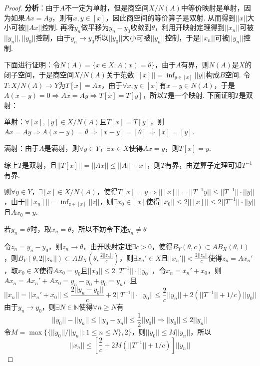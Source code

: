 \documentclass[12pt, a4paper, oneside]{ctexart}
\let\leq=\leqslant %
\let\geq=\geqslant %
\def\N{\mathbb{N}}          %
\def\add{\vspace{1ex}}      %
\begin{document}
\begin{proof}
    \textbf{分析}：由于$A$不一定为单射，但是商空间$X/N(A)$中等价映射是单射，因为如果$Ax=Ay$，则有$x,y\in [x]$，因此商空间的等价算子是双射. 从而得到$||x||$大小可被$||Ax||$控制. 再将$y_n$做平移为$y_n-y_0$收敛到$\theta$，利用开映射定理得到$||x_n||$可被$||y_n||,||y_0||$控制，由于$y_n\to y_0$所以$||y_0||$大小可被$||y_n||$控制，于是$||x_n||$可被$||y_n||$控制.
    
    下面进行证明：令$N(A) = \{x\in X:A(x) = \theta\}$，由于$A$有界，则$N(A)$是$X$的闭子空间，于是商空间$X/N(A)$关于范数$||[x]|| = \inf_{y\in[x]}||y||$构成$B$空间. 令$T:X/N(A)\to Y$为$T[x] = Ax$，由于$\forall x,y\in [x]$有$x-y \in N(A)$，于是$A(x-y) = 0\Rightarrow Ax=Ay\Rightarrow T[x] = T[y]$，所以$T$是一个映射. 下面证明$T$是双射：

    \noindent 单射：$\forall [x],[y]\in X/N(A)$且$T[x] = T[y]$，则$Ax=Ay\Rightarrow A(x-y) = \theta\Rightarrow[x-y] = [\theta]\Rightarrow[x]=[y]$.

    \noindent 满射：由于$A$是满射，则$\forall y\in Y$，$\exists x\in X$使得$Ax=y$，则$T[x] = y$.

    综上$T$是双射，且$||T[x]|| = ||Ax||\leq ||A||\cdot||x||$，则$T$有界，由逆算子定理可知$T^{-1}$有界.

    则$\forall y\in Y$，$\exists [x]\in X/N(A)$，使得$T[x] = y\Rightarrow ||[x]|| = ||T^{-1}y||\leq ||T^{-1}||\cdot ||y||$，由于$||[x_n]|| = \inf_{z\in[x]}||z||$，则$\exists x_0\in [x]$使得$||x_0||\leq 2||[x]||\leq 2||T^{-1}||\cdot ||y||$且$Ax_0 = y$.

    若$y_n=\theta$时，取$x_n = \theta$，所以不妨令下述$y_n\neq \theta$

    令$z_n = y_n-y_0$，则$z_n\to \theta$，由开映射定理$\exists c>0$，\add 使得$B_Y(\theta, c)\subset AB_X(\theta, 1)$，则$B_Y(\theta,2||z_n||)\subset AB_X(\theta,\frac{2||z_n||}{c})$，则$\exists x_n'\in X$且$||x_n'|| < \frac{2||z_n||}{c}$使得$z_n=Ax_n'$，取\add $x_0\in X$使得$Ax_0 = y_0$且$||x_0||\leq 2||T^{-1}||\cdot ||y_0||$，令$x_n = x_n'+x_0$，则$Ax_n = Ax_n'+Ax_0 = y_n-y_0+y_0 = y_n$，且
    \begin{equation*}
        ||x_n|| = ||x_n'+x_0|| \leq \frac{2||y_n-y_0||}{c} + 2||T^{-1}||\cdot ||y_0||\leq \frac{2}{c}||y_n||+2(||T^{-1}||+1/c)||y_0||
    \end{equation*}
    由于$y_n\to y_0$，则$\exists N \in \N$使得$\forall n\geq N$有
    \begin{equation*}
        ||y_0||-||y_n||\leq ||y_0-y_n||\leq \frac{1}{2}||y_0||\Rightarrow||y_0||\leq 2||y_n||
    \end{equation*}
    令$M = \max\biggl\{\{||y_0||/||y_n||:1\leq n\leq N\}, 2\biggl\}$，则$||y_0||\leq M||y_n||$，所以
    \begin{equation*}
        ||x_n||\leq \left[\frac{2}{c}+2M(||T^{-1}||+1/c)\right]||y_n||
    \end{equation*}
\end{proof}
\end{document}
